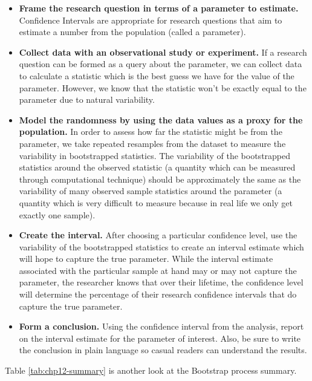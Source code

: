 \documentclass[
  10pt,
  openany]{book}
\providecommand{\tightlist}{%
  \setlength{\itemsep}{0pt}\setlength{\parskip}{0pt}}
\begin{document}
\begin{itemize}
\tightlist
\item
  \textbf{Frame the research question in terms of a parameter to estimate.} Confidence Intervals are appropriate for research questions that aim to estimate a number from the population (called a parameter).
\item
  \textbf{Collect data with an observational study or experiment.} If a research question can be formed as a query about the parameter, we can collect data to calculate a statistic which is the best guess we have for the value of the parameter. However, we know that the statistic won't be exactly equal to the parameter due to natural variability.
\item
  \textbf{Model the randomness by using the data values as a proxy for the population.} In order to assess how far the statistic might be from the parameter, we take repeated resamples from the dataset to measure the variability in bootstrapped statistics. The variability of the bootstrapped statistics around the observed statistic (a quantity which can be measured through computational technique) should be approximately the same as the variability of many observed sample statistics around the parameter (a quantity which is very difficult to measure because in real life we only get exactly one sample).
\item
  \textbf{Create the interval.} After choosing a particular confidence level, use the variability of the bootstrapped statistics to create an interval estimate which will hope to capture the true parameter. While the interval estimate associated with the particular sample at hand may or may not capture the parameter, the researcher knows that over their lifetime, the confidence level will determine the percentage of their research confidence intervals that do capture the true parameter.
\item
  \textbf{Form a conclusion.} Using the confidence interval from the analysis, report on the interval estimate for the parameter of interest. Also, be sure to write the conclusion in plain language so casual readers can understand the results.
\end{itemize}

Table \ref{tab:chp12-summary} is another look at the Bootstrap process summary.
\end{document}
